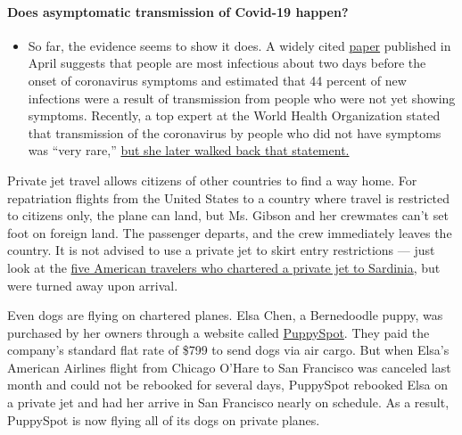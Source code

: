 \begin{itemize}
{  \paragraph{Does asymptomatic transmission of Covid-19
  happen?}\label{does-asymptomatic-transmission-of-covid-19-happen}}

  \begin{itemize}
  \tightlist
  \item
    So far, the evidence seems to show it does. A widely cited
    \href{https://www.nature.com/articles/s41591-020-0869-5}{paper}
    published in April suggests that people are most infectious about
    two days before the onset of coronavirus symptoms and estimated that
    44 percent of new infections were a result of transmission from
    people who were not yet showing symptoms. Recently, a top expert at
    the World Health Organization stated that transmission of the
    coronavirus by people who did not have symptoms was ``very rare,''
    \href{https://www.nytimes.com/2020/06/09/world/coronavirus-updates.html?action=click\&pgtype=Article\&state=default\&region=MAIN_CONTENT_3\&context=storylines_faq\#link-1f302e21}{but
    she later walked back that statement.}
  \end{itemize}
\end{itemize}

Private jet travel allows citizens of other countries to find a way
home. For repatriation flights from the United States to a country where
travel is restricted to citizens only, the plane can land, but Ms.
Gibson and her crewmates can't set foot on foreign land. The passenger
departs, and the crew immediately leaves the country. It is not advised
to use a private jet to skirt entry restrictions --- just look at the
\href{https://www.nytimes.com/2020/07/07/world/europe/american-passport-privilege-coronavirus.html}{five
American travelers who chartered a private jet to Sardinia}, but were
turned away upon arrival.

Even dogs are flying on chartered planes. Elsa Chen, a Bernedoodle
puppy, was purchased by her owners through a website called
\href{https://www.puppyspot.com/}{PuppySpot}. They paid the company's
standard flat rate of \$799 to send dogs via air cargo. But when Elsa's
American Airlines flight from Chicago O'Hare to San Francisco was
canceled last month and could not be rebooked for several days,
PuppySpot rebooked Elsa on a private jet and had her arrive in San
Francisco nearly on schedule. As a result, PuppySpot is now flying all
of its dogs on private planes.

